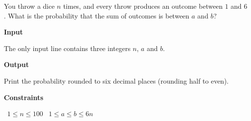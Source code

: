 You throw a dice $n$ times, and every throw produces an outcome between $1$ and $6$. What is the probability that the sum of outcomes is between $a$ and $b$?

\vspace{0.3cm}\noindent\textbf{Input}

The only input line contains three integers $n$, $a$ and $b$.

\vspace{0.3cm}\noindent\textbf{Output}

Print the probability rounded to six decimal places (rounding half to even).

\vspace{0.3cm}\noindent\textbf{Constraints}

\textbullet\ $1 \le n \le 100$
\textbullet\ $1 \le a \le b \le 6n$